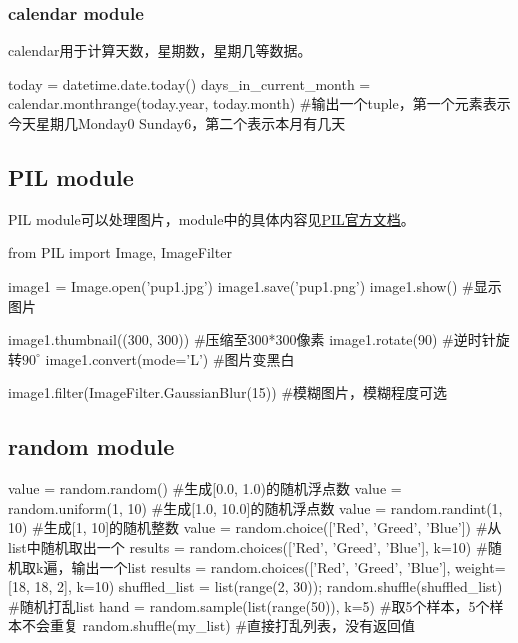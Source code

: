     \subsubsection{calendar module}
      calendar用于计算天数，星期数，星期几等数据。
      \begin{codeblock}[language=python, caption={calendar module}]
        today = datetime.date.today()
        days_in_current_month = calendar.monthrange(today.year, today.month)
        #输出一个tuple，第一个元素表示今天星期几Monday0 Sunday6，第二个表示本月有几天
      \end{codeblock}

  \subsection{PIL module}
    PIL module可以处理图片，module中的具体内容见\href{https://pillow-cn.readthedocs.io/zh-cn/latest/}{\underline{PIL官方文档}}。
    \begin{codeblock}[language=python, caption={PIL}]
      from PIL import Image, ImageFilter

      image1 = Image.open('pup1.jpg')
      image1.save('pup1.png')
      image1.show() #显示图片

      image1.thumbnail((300, 300)) #压缩至300*300像素
      image1.rotate(90) #逆时针旋转$90^{\circ}$
      image1.convert(mode='L') #图片变黑白

      image1.filter(ImageFilter.GaussianBlur(15)) #模糊图片，模糊程度可选
    \end{codeblock}

  \subsection{random module}
    \begin{codeblock}[language=python, caption={random module}]
      value = random.random() #生成[0.0, 1.0)的随机浮点数
      value = random.uniform(1, 10) #生成[1.0, 10.0]的随机浮点数
      value = random.randint(1, 10) #生成[1, 10]的随机整数
      value = random.choice(['Red', 'Greed', 'Blue']) #从list中随机取出一个
      results = random.choices(['Red', 'Greed', 'Blue'], k=10) #随机取k遍，输出一个list
      results = random.choices(['Red', 'Greed', 'Blue'], weight=[18, 18, 2], k=10) 
      shuffled_list = list(range(2, 30)); random.shuffle(shuffled_list) #随机打乱list
      hand = random.sample(list(range(50)), k=5) #取5个样本，5个样本不会重复
      random.shuffle(my_list) #直接打乱列表，没有返回值
    \end{codeblock}

